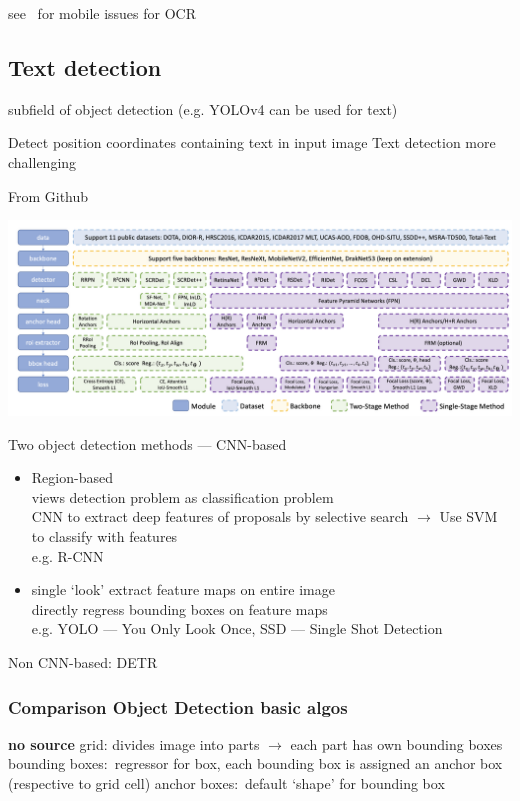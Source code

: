 see~\cite{sourvanos_challenges_2018} for mobile issues for \ac{OCR}


\subsection*{Text detection}
subfield of object detection (e.g. YOLOv4 can be used for text)

Detect position coordinates containing text in input image
Text detection more challenging

From Github~\citep{noauthor_yangxue0827rotationdetection_nodate}

\includegraphics[width=\textwidth]{img/Detection-Modules.png}

Two object detection methods --- CNN-based
\begin{itemize}
    \item Region-based \\
        views detection problem as classification problem\\
        CNN to extract deep features of proposals by selective search $\rightarrow$  Use SVM to
            classify with features\\
        e.g. R-CNN
    \item  single `look'
        extract feature maps on entire image\\
        directly regress bounding boxes on feature maps\\
        e.g. YOLO --- You Only Look Once, SSD --- Single Shot Detection
\end{itemize}
Non CNN-based: DETR

\subsubsection*{Comparison Object Detection basic algos}

\textbf{no source}
grid: divides image into parts $\rightarrow$ each part has own bounding boxes
bounding boxes:~regressor for box, each bounding box is assigned an anchor box (respective to grid cell)
anchor boxes:~default `shape' for bounding box

